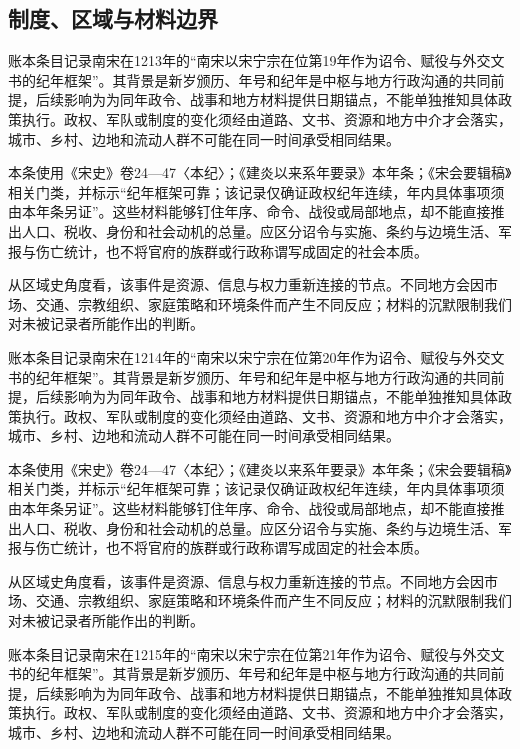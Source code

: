 \subsection{制度、区域与材料边界}

账本条目记录南宋在1213年的“南宋以宋宁宗在位第19年作为诏令、赋役与外交文书的纪年框架”。其背景是新岁颁历、年号和纪年是中枢与地方行政沟通的共同前提，后续影响为为同年政令、战事和地方材料提供日期锚点，不能单独推知具体政策执行。政权、军队或制度的变化须经由道路、文书、资源和地方中介才会落实，城市、乡村、边地和流动人群不可能在同一时间承受相同结果。

本条使用《宋史》卷24—47〈本纪〉；《建炎以来系年要录》本年条；《宋会要辑稿》相关门类，并标示“纪年框架可靠；该记录仅确证政权纪年连续，年内具体事项须由本年条另证”。这些材料能够钉住年序、命令、战役或局部地点，却不能直接推出人口、税收、身份和社会动机的总量。应区分诏令与实施、条约与边境生活、军报与伤亡统计，也不将官府的族群或行政称谓写成固定的社会本质。

从区域史角度看，该事件是资源、信息与权力重新连接的节点。不同地方会因市场、交通、宗教组织、家庭策略和环境条件而产生不同反应；材料的沉默限制我们对未被记录者所能作出的判断。

账本条目记录南宋在1214年的“南宋以宋宁宗在位第20年作为诏令、赋役与外交文书的纪年框架”。其背景是新岁颁历、年号和纪年是中枢与地方行政沟通的共同前提，后续影响为为同年政令、战事和地方材料提供日期锚点，不能单独推知具体政策执行。政权、军队或制度的变化须经由道路、文书、资源和地方中介才会落实，城市、乡村、边地和流动人群不可能在同一时间承受相同结果。

本条使用《宋史》卷24—47〈本纪〉；《建炎以来系年要录》本年条；《宋会要辑稿》相关门类，并标示“纪年框架可靠；该记录仅确证政权纪年连续，年内具体事项须由本年条另证”。这些材料能够钉住年序、命令、战役或局部地点，却不能直接推出人口、税收、身份和社会动机的总量。应区分诏令与实施、条约与边境生活、军报与伤亡统计，也不将官府的族群或行政称谓写成固定的社会本质。

从区域史角度看，该事件是资源、信息与权力重新连接的节点。不同地方会因市场、交通、宗教组织、家庭策略和环境条件而产生不同反应；材料的沉默限制我们对未被记录者所能作出的判断。

账本条目记录南宋在1215年的“南宋以宋宁宗在位第21年作为诏令、赋役与外交文书的纪年框架”。其背景是新岁颁历、年号和纪年是中枢与地方行政沟通的共同前提，后续影响为为同年政令、战事和地方材料提供日期锚点，不能单独推知具体政策执行。政权、军队或制度的变化须经由道路、文书、资源和地方中介才会落实，城市、乡村、边地和流动人群不可能在同一时间承受相同结果。

